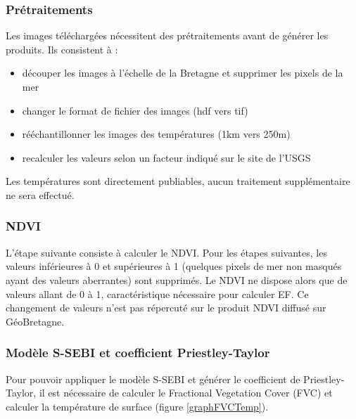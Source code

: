 \documentclass[10pt,a4paper]{article}
\begin{document}
\subsubsection{Prétraitements}

Les images téléchargées nécessitent des prétraitements avant de générer les produits. Ils consistent à :

\begin{itemize}
\item découper les images à l'échelle de la Bretagne et supprimer les pixels de la mer
\item changer le format de fichier des images (hdf vers tif)
\item rééchantillonner les images des températures (1km vers 250m)
\item recalculer les valeurs selon un facteur indiqué sur le site de l'USGS
\end{itemize}

Les températures sont directement publiables, aucun traitement supplémentaire ne sera effectué.

\subsubsection{NDVI}

L'étape suivante consiste à calculer le NDVI. Pour les étapes suivantes, les valeurs inférieures à 0 et supérieures à 1 (quelques pixels de mer non masqués ayant des valeurs aberrantes) sont supprimés. Le NDVI ne dispose alors que de valeurs allant de 0 à 1, caractéristique nécessaire pour calculer EF. Ce changement de valeurs n'est pas répercuté sur le produit NDVI diffusé sur GéoBretagne.

\subsubsection{Modèle S-SEBI et coefficient Priestley-Taylor}

Pour pouvoir appliquer le modèle S-SEBI et générer le coefficient de Priestley-Taylor, il est nécessaire de calculer le Fractional Vegetation Cover (FVC) et calculer la température de surface (figure \ref{graphFVCTemp}).
\end{document}
